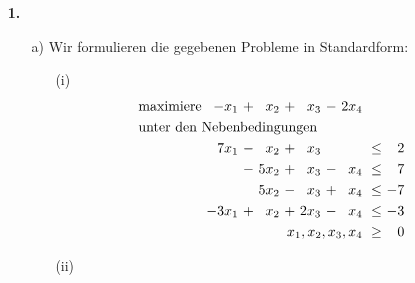 \documentclass [a4paper,11pt]{article}
\author{\authorinfotitle}
\title{\titleinfo}
\date{\today}
\begin{document}
\maketitle
    \begin{enumerate}
        \item[\textbf{1.}]
            \begin{enumerate}
                \item[a)]
                    Wir formulieren die gegebenen Probleme in Standardform:
                    \begin{enumerate}
                        \item[(i)]
                            \begin{align*}
                            \begin{alignedat}{6}
                            & \text{maximiere } & -x_1 &\ + &\ x_2 &\ + &\ x_3 &\ - &\ 2x_4 & & \\
                            & \rlap{unter den Nebenbedingungen} & & & & & & & & & \\
                            && 7x_1 &\ - &\  x_2 &\ + &\  x_3 &    &       &\ \leq &\ 2 \\
                            &&      &\ - &\ 5x_2 &\ + &\  x_3 &\ - &\  x_4 &\ \leq &\ 7 \\
                            &&      &\  &\ 5x_2 &\ - &\  x_3 &\ + &\  x_4 &\ \leq &\ -7 \\
                            && -3x_1 &\ + &\  x_2 &\ + &\ 2x_3 &\ - &\  x_4 &\ \leq &\ -3 \\
                            && & & & & & & \llap{$x_1, x_2, x_3,x_4$} &\ \geq &\ 0
                            \end{alignedat}
                            \end{align*}
                        \item[(ii)]

\end{enumerate}
\end{enumerate}
\end{enumerate}
\end{document}
